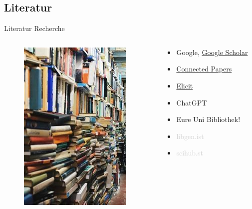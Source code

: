 \documentclass[aspectratio=169,shownotes]{beamer}
\begin{document}
\subsection{Literatur}
\begin{frame}{Literatur Recherche}
    \begin{columns}[t]
        \begin{column}{0.29\textwidth}
            \vspace*{-0.1\textheight}
            \begin{figure}[t]
                \includegraphics[height=0.8\textheight]{graphics/LiteraturChaos.jpeg}         
            \end{figure}
        \end{column}        
        \begin{column}{0.69\textwidth}
            \begin{itemize}
                \item Google, \href{https://scholar.google.com/}{Google Scholar}
                \item \href{https://www.connectedpapers.com/}{Connected Papers}
                \item \href{https://elicit.com/}{Elicit}
                \item ChatGPT
                \item Eure Uni Bibliothek!
            \end{itemize}           
            \vspace{1cm}            
            \begin{itemize}
                \item \textcolor{lightgray}{libgen.ist}
                \item \textcolor{lightgray}{scihub.st}
            \end{itemize} 
        \end{column}        
    \end{columns}  
\end{frame}
\end{document}
